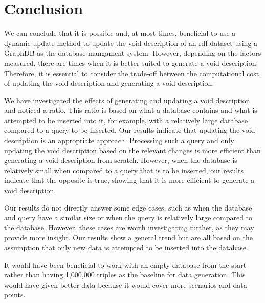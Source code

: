 \section{Conclusion}\label{sec:conclusion}
We can conclude that it is possible and, at most times, beneficial to use a dynamic update method to update the \gls{void} description of an \gls{rdf} dataset using a GraphDB as the database mangament system. However, depending on the factors measured, there are times when it is better suited to generate a \gls{void} description. Therefore, it is essential to consider the trade-off between the computational cost of updating the \gls{void} description and generating a \gls{void} description.


We have investigated the effects of generating and updating a \gls{void} description and noticed a ratio. This ratio is based on what a database contains and what is attempted to be inserted into it, for example, with a relatively large database compared to a query to be inserted. Our results indicate that updating the \gls{void} description is an appropriate approach. Processing such a query and only updating the \gls{void} description based on the relevant changes is more efficient than generating a \gls{void} description from scratch. However, when the database is relatively small when compared to a query that is to be inserted, our results indicate that the opposite is true, showing that it is more efficient to generate a \gls{void} description.

Our results do not directly answer some edge cases, such as when the database and query have a similar size or when the query is relatively large compared to the database. However, these cases are worth investigating further, as they may provide more insight. Our results show a general trend but are all based on the assumption that only new data is attempted to be inserted into the database.

It would have been beneficial to work with an empty database from the start rather than having 1,000,000 triples as the baseline for data generation. This would have given better data because it would cover more scenarios and data points.

